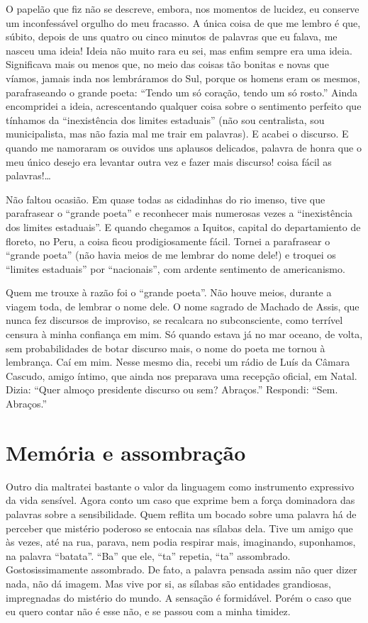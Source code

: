 O papelão que fiz não se descreve, embora, nos momentos de lucidez, eu
conserve um inconfessável orgulho do meu fracasso. A única coisa de que
me lembro é que, súbito, depois de uns quatro ou cinco minutos de
palavras que eu falava, me nasceu uma ideia! Ideia não muito rara eu
sei, mas enfim sempre era uma ideia. Significava mais ou menos que, no
meio das coisas tão bonitas e novas que víamos, jamais inda nos
lembráramos do Sul, porque os homens eram os mesmos, parafraseando o
grande poeta: ``Tendo um só coração, tendo um só rosto.'' Ainda
encompridei a ideia, acrescentando qualquer coisa sobre o sentimento
perfeito que tínhamos da ``inexistência dos limites estaduais'' (não sou
centralista, sou municipalista, mas não fazia mal me trair em palavras).
E acabei o discurso. E quando me namoraram os ouvidos uns aplausos
delicados, palavra de honra que o meu único desejo era levantar outra
vez e fazer mais discurso! coisa fácil as palavras!\ldots{}

Não faltou ocasião. Em quase todas as cidadinhas do rio imenso, tive que
parafrasear o ``grande poeta'' e reconhecer mais numerosas vezes a
``inexistência dos limites estaduais''. E quando chegamos a Iquitos,
capital do departamiento de floreto, no Peru, a coisa ficou
prodigiosamente fácil. Tornei a parafrasear o ``grande poeta'' (não havia
meios de me lembrar do nome dele!) e troquei os ``limites estaduais'' por
``nacionais'', com ardente sentimento de americanismo.

Quem me trouxe à razão foi o ``grande poeta''. Não houve meios, durante a
viagem toda, de lembrar o nome dele. O nome sagrado de Machado de Assis,
que nunca fez discursos de improviso, se recalcara no subconsciente,
como terrível censura à minha confiança em mim. Só quando estava já no
mar oceano, de volta, sem probabilidades de botar discurso mais, o nome
do poeta me tornou à lembrança. Caí em mim. Nesse mesmo dia, recebi um
rádio de Luís da Câmara Cascudo, amigo íntimo, que ainda nos preparava
uma recepção oficial, em Natal. Dizia: ``Quer almoço presidente discurso
ou sem? Abraços.'' Respondi: ``Sem. Abraços.''

\chapter{Memória e assombração}

Outro dia maltratei bastante o valor da linguagem como instrumento
expressivo da vida sensível. Agora conto um caso que exprime bem a força
dominadora das palavras sobre a sensibilidade. Quem reflita um bocado
sobre uma palavra há de perceber que mistério poderoso se entocaia nas
sílabas dela. Tive um amigo que às vezes, até na rua, parava, nem podia
respirar mais, imaginando, suponhamos, na palavra ``batata''. ``Ba'' que
ele, ``ta'' repetia, ``ta'' assombrado. Gostosissimamente assombrado. De
fato, a palavra pensada assim não quer dizer nada, não dá imagem. Mas
vive por si, as sílabas são entidades grandiosas, impregnadas do
mistério do mundo. A sensação é formidável. Porém o caso que eu quero
contar não é esse não, e se passou com a minha timidez.

